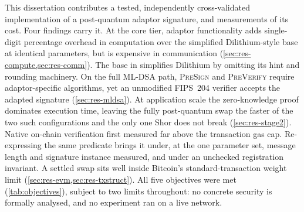 This dissertation contributes a tested, independently cross-validated implementation of a
post-quantum adaptor signature, and measurements of its cost. Four findings carry it.
At the core tier, adaptor functionality adds single-digit percentage overhead in
computation over the simplified Dilithium-style base at identical parameters, but is
expensive in communication (\cref{sec:res-compute,sec:res-comm}). The base in \cite{esgin2020post}
simplifies Dilithium by omitting its hint and rounding machinery. On the full
ML-DSA path, \textsc{PreSign} and
\textsc{PreVerify} require adaptor-specific algorithms, yet
an unmodified FIPS~204 verifier accepts the adapted signature (\cref{sec:res-mldsa}). At
application scale the zero-knowledge proof dominates execution time, leaving
the fully post-quantum swap the faster of the two such configurations and the only one Shor
does not break (\cref{sec:res-stage2}). Native on-chain verification first
measured far above the transaction gas cap. Re-expressing the same predicate brings it
under, at the one parameter set, message length and signature instance measured, and
under an unchecked registration invariant. A settled swap sits well inside
Bitcoin's standard-transaction weight limit
(\cref{sec:res-evm,sec:res-txstruct}). All
five objectives were met (\cref{tab:objectives}), subject to two limits throughout: no
concrete security is formally analysed, and no experiment ran on a live network.


